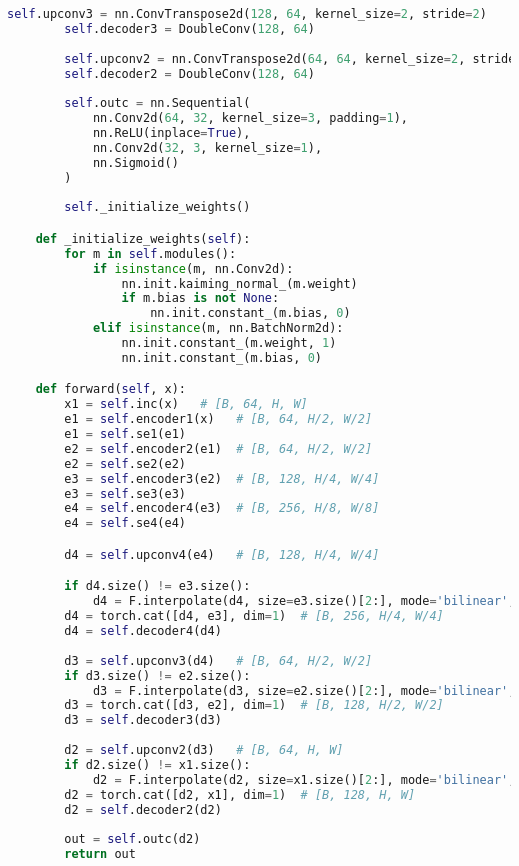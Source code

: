 \documentclass{apmcmthesis}
\begin{document}
\begin{lstlisting}[language=python,caption={Deep Learning Model Architecture}]
        self.upconv3 = nn.ConvTranspose2d(128, 64, kernel_size=2, stride=2)
        self.decoder3 = DoubleConv(128, 64)
        
        self.upconv2 = nn.ConvTranspose2d(64, 64, kernel_size=2, stride=2)
        self.decoder2 = DoubleConv(128, 64)
        
        self.outc = nn.Sequential(
            nn.Conv2d(64, 32, kernel_size=3, padding=1),
            nn.ReLU(inplace=True),
            nn.Conv2d(32, 3, kernel_size=1),
            nn.Sigmoid()
        )
        
        self._initialize_weights()

    def _initialize_weights(self):
        for m in self.modules():
            if isinstance(m, nn.Conv2d):
                nn.init.kaiming_normal_(m.weight)
                if m.bias is not None:
                    nn.init.constant_(m.bias, 0)
            elif isinstance(m, nn.BatchNorm2d):
                nn.init.constant_(m.weight, 1)
                nn.init.constant_(m.bias, 0)

    def forward(self, x):
        x1 = self.inc(x)   # [B, 64, H, W]
        e1 = self.encoder1(x)   # [B, 64, H/2, W/2]
        e1 = self.se1(e1)
        e2 = self.encoder2(e1)  # [B, 64, H/2, W/2]
        e2 = self.se2(e2)
        e3 = self.encoder3(e2)  # [B, 128, H/4, W/4]
        e3 = self.se3(e3)
        e4 = self.encoder4(e3)  # [B, 256, H/8, W/8]
        e4 = self.se4(e4)

        d4 = self.upconv4(e4)   # [B, 128, H/4, W/4]

        if d4.size() != e3.size():
            d4 = F.interpolate(d4, size=e3.size()[2:], mode='bilinear', align_corners=False)
        d4 = torch.cat([d4, e3], dim=1)  # [B, 256, H/4, W/4]
        d4 = self.decoder4(d4)
        
        d3 = self.upconv3(d4)   # [B, 64, H/2, W/2]
        if d3.size() != e2.size():
            d3 = F.interpolate(d3, size=e2.size()[2:], mode='bilinear', align_corners=False)
        d3 = torch.cat([d3, e2], dim=1)  # [B, 128, H/2, W/2]
        d3 = self.decoder3(d3)
        
        d2 = self.upconv2(d3)   # [B, 64, H, W]
        if d2.size() != x1.size():
            d2 = F.interpolate(d2, size=x1.size()[2:], mode='bilinear', align_corners=False)
        d2 = torch.cat([d2, x1], dim=1)  # [B, 128, H, W]
        d2 = self.decoder2(d2)
        
        out = self.outc(d2)
        return out
\end{lstlisting}
\end{document}
